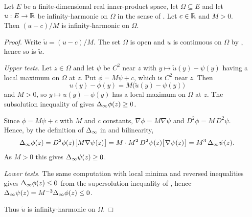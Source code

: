 \begin{lemma}
Let $E$ be a finite-dimensional real inner-product space, let $\Omega\subseteq E$
and let $u:E\to\mathbb{R}$ be infinity-harmonic on $\Omega$ in the sense of
. Let $c\in\mathbb{R}$ and $M>0$. Then $(u-c)/M$ is
infinity-harmonic on $\Omega$.
\end{lemma}
\begin{proof}
Write $\widetilde u=(u-c)/M$. The set $\Omega$ is open and $u$ is continuous on
$\Omega$ by , hence so is $\widetilde u$.

\emph{Upper tests.} Let $z\in\Omega$ and let $\psi$ be $C^2$ near $z$ with
$y\mapsto\widetilde u(y)-\psi(y)$ having a local maximum on $\Omega$ at $z$. Put
$\phi=M\psi+c$, which is $C^2$ near $z$. Then
\[
  u(y)-\phi(y)=M\bigl(\widetilde u(y)-\psi(y)\bigr)
\]
and $M>0$, so $y\mapsto u(y)-\phi(y)$ has a local maximum on $\Omega$ at $z$.
The subsolution inequality of  gives
$\Delta_{\infty}\phi(z)\ge0$.

Since $\phi=M\psi+c$ with $M$ and $c$ constants, $\nabla\phi=M\nabla\psi$ and
$D^2\phi=M\,D^2\psi$. Hence, by the definition of $\Delta_{\infty}$ in 
and bilinearity,
\[
  \Delta_{\infty}\phi(z)=D^2\phi(z)\bigl[M\nabla\psi(z)\bigr]
    =M\cdot M^2\,D^2\psi(z)\bigl[\nabla\psi(z)\bigr]
    =M^3\,\Delta_{\infty}\psi(z).
\]
As $M>0$ this gives $\Delta_{\infty}\psi(z)\ge0$.

\emph{Lower tests.} The same computation with local minima and reversed
inequalities gives $\Delta_{\infty}\phi(z)\le0$ from the supersolution inequality of
, hence $\Delta_{\infty}\psi(z)=M^{-3}\Delta_{\infty}\phi(z)\le0$.

Thus $\widetilde u$ is infinity-harmonic on $\Omega$.
\end{proof}
